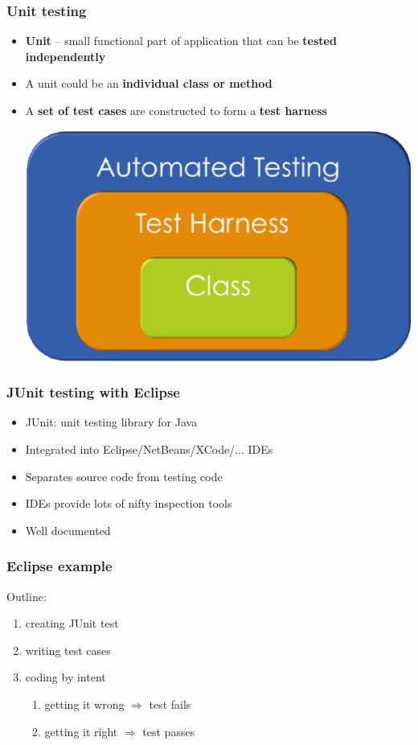 \documentclass{beamer}
\begin{document}
\begin{frame}
\frametitle{Unit testing}
\label{sec-9}
\begin{itemize}

\item \textbf{Unit} – small functional part of application that can be \textbf{tested independently}
\label{sec-9-1}%

\item A unit could be an \textbf{individual class or method}
\label{sec-9-2}%

\item A \textbf{set of test cases} are constructed to form a \textbf{test harness}\bigskip
\begin{center}
\label{sec-9-3}%
\includegraphics[width=.5\textwidth]{./bowers-test-harness.png}
\end{center}
\end{itemize} %
\end{frame}
\begin{frame}
\frametitle{JUnit testing with Eclipse}
\label{sec-10}
\begin{itemize}

\item JUnit: unit testing library for Java
\label{sec-10-1}%

\item Integrated into Eclipse/NetBeans/XCode/... IDEs
\label{sec-10-2}%

\item Separates source code from testing code
\label{sec-10-3}%

\item IDEs provide lots of nifty inspection tools
\label{sec-10-4}%

\item Well documented
\label{sec-10-5}%
\end{itemize} %
\end{frame}
\begin{frame}
\frametitle{Eclipse example}
\label{sec-11}

  Outline:
\begin{enumerate}
\item creating JUnit test
\item writing test cases
\item coding by intent
\begin{enumerate}
\item getting it wrong $\Rightarrow$ test fails
\item getting it right $\Rightarrow$ test passes
\end{enumerate}
\end{enumerate}
\end{frame}
\end{document}
